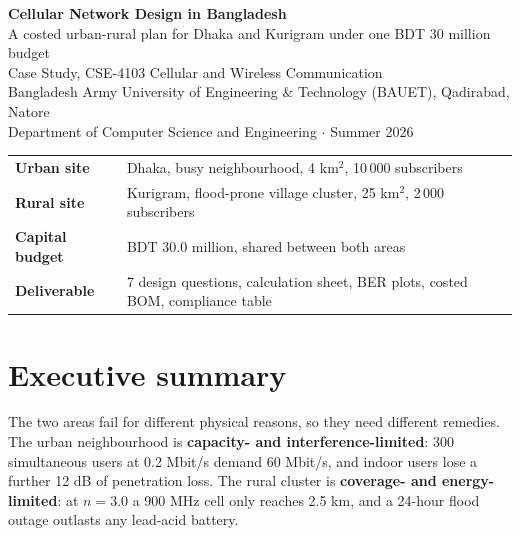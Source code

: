 \documentclass[9pt,a4paper]{article}
\newcommand{\key}[1]{\textbf{#1}}
\begin{document}
\begin{center}
{\LARGE\bfseries Cellular Network Design in Bangladesh}\\[3pt]
{\large A costed urban-rural plan for Dhaka and Kurigram under one BDT 30 million budget}\\[8pt]
{\normalsize Case Study, CSE-4103 Cellular and Wireless Communication}\\[2pt]
{\small Bangladesh Army University of Engineering \& Technology (BAUET), Qadirabad, Natore}\\[2pt]
{\small Department of Computer Science and Engineering $\cdot$ Summer 2026}
\end{center}

\vspace{-4pt}
\begin{center}\small
\begin{tabular}{@{}ll@{}}
\toprule
\textbf{Urban site} & Dhaka, busy neighbourhood, 4 km$^2$, 10\,000 subscribers \\
\textbf{Rural site} & Kurigram, flood-prone village cluster, 25 km$^2$, 2\,000 subscribers \\
\textbf{Capital budget} & BDT 30.0 million, shared between both areas \\
\textbf{Deliverable} & 7 design questions, calculation sheet, BER plots, costed BOM, compliance table \\
\bottomrule
\end{tabular}
\end{center}

\section*{Executive summary}

The two areas fail for different physical reasons, so they need different remedies. The urban
neighbourhood is \key{capacity- and interference-limited}: 300 simultaneous users at 0.2 Mbit/s
demand 60 Mbit/s, and indoor users lose a further 12 dB of penetration loss. The rural cluster is
\key{coverage- and energy-limited}: at $n=3.0$ a 900 MHz cell only reaches 2.5 km, and a
24-hour flood outage outlasts any lead-acid battery.
\end{document}
